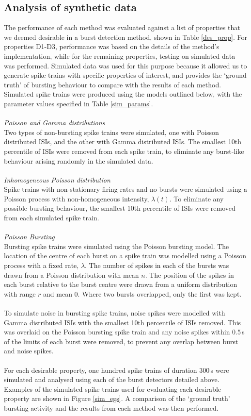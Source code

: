 \documentclass[12pt, titlepage]{article}
\begin{document}
	\subsection*{Analysis of synthetic data}
	The performance of each method was evaluated against a list of properties that we deemed desirable in a burst detection method, shown in Table \ref{des_prop}. For properties D1-D3, performance was based on the details of the method's implementation, while for the remaining properties, testing on simulated data was performed. Simulated data was used for this purpose because it allowed us to generate spike trains with specific properties of interest, and provides the `ground truth' of bursting behaviour to compare with the results of each method. Simulated spike trains were produced using the models outlined below, with the parameter values specified in Table \ref{sim_params}.
	\\\\ 	\textit{Poisson and Gamma distributions}
	\\Two types of non-bursting spike trains were simulated, one with Poisson distributed ISIs, and the other with Gamma distributed ISIs. The smallest 10th percentile of ISIs were removed from each spike train, to eliminate any burst-like behaviour arising randomly in the simulated data.
	\\ \\  \textit{Inhomogeneous Poisson distribution}
	\\ Spike trains with non-stationary firing rates and no bursts were simulated using a Poisson process with non-homogeneous intensity, $\lambda(t)$. To eliminate any possible bursting behaviour, the smallest 10th percentile of ISIs were removed from each simulated spike train.
	\\ \\  \textit{Poisson Bursting}
	\\ Bursting spike trains were simulated using the Poisson bursting model. The location of the centre of each burst on a spike train was modelled using a Poisson process with a fixed rate, $\lambda$. The number of spikes in each of the bursts was drawn from a Poisson distribution with mean $n$. The position of the spikes in each burst relative to the burst centre were drawn from a uniform distribution with range $r$ and mean 0. Where two bursts overlapped, only the first was kept. 
	\\ \\ To simulate noise in bursting spike trains, noise spikes were modelled with Gamma distributed ISIs with the smallest 10th percentile of ISIs removed. This was overlaid on the Poisson bursting spike train and any noise spikes within $0.5 \,$s of the limits of each burst were removed, to prevent any overlap between burst and noise spikes.
	\\ \\ For each desirable property, one hundred spike trains of duration 300$\,$s were simulated and analysed using each of the burst detectors detailed above. Examples of the simulated spike trains used for evaluating each desirable property are shown in Figure \ref{sim_egs}. A comparison of the `ground truth' bursting activity and the results from each method was then performed. 
\end{document}
